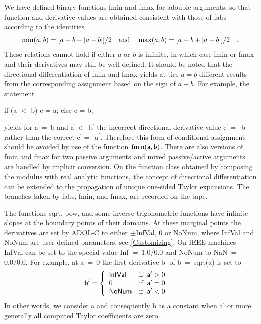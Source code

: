 \documentclass[11pt,twoside]{article}
\begin{document}
We have defined binary functions {\sf fmin} and {\sf fmax} for {\sf adouble}
arguments, so that function and derivative values are obtained consistent
with those of {\sf fabs} according to the identities
\[
 \min(a,b) = [a+b-|a-b|]/2 \quad {\rm and} \quad
 \max(a,b) = [a+b+|a-b|]/2 \quad . 
\]
These relations cannot hold if either $a$ or $b$ is infinite, in which
case {\sf fmin} or {\sf fmax} and their derivatives may still be well
defined. It should be noted that the directional differentiation of
{\sf fmin} and {\sf fmax} yields at ties $a=b$ different results from
the corresponding assignment based on the sign of $a-b$. For example,
the statement 
\begin{center}
 {\sf if (a $<$ b) c = a; else c = b;}
\end{center} 
yields for {\sf a}~=~{\sf b} and {\sf a}$^\prime < $~{\sf b}$^\prime$
the incorrect directional derivative value 
{\sf c}$^\prime = $~{\sf  b}$^\prime$ rather than the correct
{\sf c}$^\prime = $~{\sf  a}$^\prime$. Therefore this form of conditional assignment
should be avoided by use of the function $\sf fmin(a,b)$. There
are also versions of {\sf fmin} and {\sf fmax} for two passive 
arguments and mixed passive/active arguments are handled by 
implicit conversion. 
On the function class obtained by composing the modulus with real
analytic functions, the concept of directional differentiation can be
extended to the propagation of unique one-sided Taylor expansions.
The branches taken by {\sf fabs, fmin}, and {\sf fmax}, are recorded 
on the tape. 

The functions {\sf sqrt}, {\sf pow}, and some inverse trigonometric
functions have infinite slopes at the boundary points of their domains.
At these marginal points the derivatives are set by ADOL-C to 
either {\sf $\pm$InfVal}, 0
or {\sf NoNum}, where {\sf InfVal} and {\sf NoNum} are user-defined 
parameters, see \autoref{Customizing}.
On IEEE machines {\sf InfVal} can be set to the special value 
{\sf Inf}~=~$1.0/0.0$ and {\sf NoNum} to {\sf NaN}~=~$0.0/0.0$.
For example, at {\sf a}~=~0 the first derivative {\sf b}$^\prime$ 
of {\sf b}~=~{\sf sqrt(a)} is set to 
\[
{\sf b}^\prime = \left\{
\begin{array}{ll}
\sf InfVal&\mbox{if}\;\; {\sf a}^\prime>0  \\
0&\mbox{if}\;\;{\sf a}^\prime =0 \\
\sf NoNum&\mbox{if}\;\;{\sf a}^\prime <0\\
\end{array} \right.  \enspace .
\]
In other words, we consider {\sf a} and
consequently {\sf b}  as a constant when {\sf a}$^\prime$ or more generally
all computed Taylor coefficients are zero. 
\end{document}
